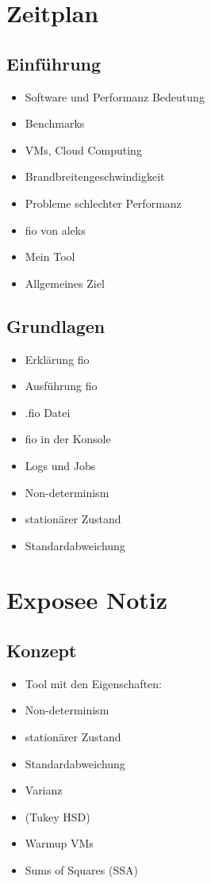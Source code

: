 \documentclass{article}
\begin{document}
\section{Zeitplan}
\subsection{Einführung}
 \begin{itemize}
    \item Software und Performanz Bedeutung
    \item Benchmarks
    \item VMs, Cloud Computing
    \item Brandbreitengeschwindigkeit
    \item Probleme schlechter Performanz
    \item fio von aleks
    \item Mein Tool
    \item Allgemeines Ziel
 \end{itemize}
\subsection{Grundlagen}
\begin{itemize}
    \item Erklärung fio
    \item Ausführung fio
    \item .fio Datei
    \item fio in der Konsole
    \item Logs und Jobs
    \item Non-determinism
    \item stationärer Zustand
    \item Standardabweichung
\end{itemize}
\section{Exposee Notiz}
\subsection{Konzept}
\begin{itemize}
    \item Tool mit den Eigenschaften:
    \item Non-determinism
    \item stationärer Zustand
    \item Standardabweichung
    \item Varianz
    \item (Tukey HSD)
    \item Warmup VMs
    \item Sums of Squares (SSA)
\end{itemize}
\end{document}
